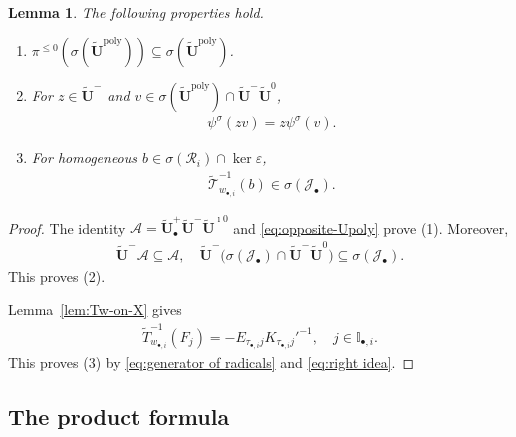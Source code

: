 \documentclass[a4paper,reqno,12pt]{amsart}
\numberwithin{equation}{section}
\newtheorem{lemma}[proposition]{Lemma}
\theoremstyle{definition}
\theoremstyle{plain}
\theoremstyle{definition}
\def\I{\mathbb I}
\def\bIi{\I_{\bullet,i}}
\def\bwi{w_{\bullet,i}}
\def\tU{\widetilde{\mathbf U}}
\def \tbU{\tU_{\bullet}}
\def\tTD{\widetilde T}
\def\tT{\widetilde{\mathscr T}}
\def\cA{\mathcal A}
\def\cR{\mathcal R}
\def\cJ{\mathcal J}
\newcommand{\eps}{\varepsilon}
\newcommand{\poly}{\mathrm{poly}}
\begin{document}
\begin{lemma}\label{lem:PBW}
The following properties hold.
\begin{enumerate}
\item $\pi^{\le0}(\sigma(\tU^\poly))\subseteq\sigma(\tU^\poly)$.
\item For $z\in\tU^-$ and
$v\in\sigma(\tU^\poly)\cap\tU^-\tU^0$,
\begin{align}
\psi^\sigma(zv)=z\psi^\sigma(v).\label{eq:negative-Cartan}
\end{align}
\item For homogeneous $b\in\sigma(\cR_i)\cap\ker\eps$,
\begin{align}
\tT_{\bwi}^{-1}(b)\in\sigma(\cJ_\bullet).
\label{eq:positive-kernel}
\end{align}
\end{enumerate}
\end{lemma}
\begin{proof}
    The identity $\cA=\tbU^+\tU^-\tU^{\imath0}$ and \eqref{eq:opposite-Upoly} prove (1). Moreover,
    \begin{align*}
        \tU^-\cA\subseteq\cA,\quad \tU^-\big(\sigma(\cJ_\bullet)\cap\tU^-\tU^0\big)\subseteq\sigma(\cJ_\bullet).
    \end{align*}
    This proves (2).

    Lemma~\ref{lem:Tw-on-X} gives
    \begin{align*}
        \tTD_{\bwi}^{-1}(F_j)=-E_{\tau_{\bullet,i} j} K_{\tau_{\bullet,i}j}'^{-1},\quad j\in\bIi.
    \end{align*}
    This proves (3) by \eqref{eq:generator of radicals} and \eqref{eq:right idea}.
\end{proof}

\subsection{The product formula}
\end{document}
